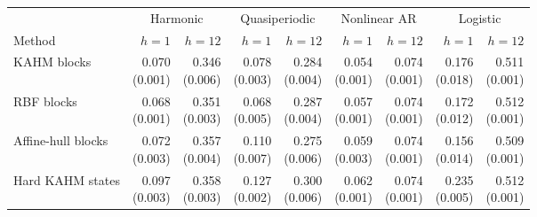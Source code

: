 \begin{table}[t]
\centering\small
\setlength{\tabcolsep}{3pt}
\begin{tabular}{lrrrrrrrr}
\toprule
& \multicolumn{2}{c}{Harmonic} & \multicolumn{2}{c}{Quasiperiodic} & \multicolumn{2}{c}{Nonlinear AR} & \multicolumn{2}{c}{Logistic}\\
Method & $h=1$ & $h=12$ & $h=1$ & $h=12$ & $h=1$ & $h=12$ & $h=1$ & $h=12$\\
\midrule
KAHM blocks & \shortstack[r]{0.070\\(0.001)} & \shortstack[r]{0.346\\(0.006)} & \shortstack[r]{0.078\\(0.003)} & \shortstack[r]{0.284\\(0.004)} & \shortstack[r]{0.054\\(0.001)} & \shortstack[r]{0.074\\(0.001)} & \shortstack[r]{0.176\\(0.018)} & \shortstack[r]{0.511\\(0.001)}\\[2pt]
RBF blocks & \shortstack[r]{0.068\\(0.001)} & \shortstack[r]{0.351\\(0.003)} & \shortstack[r]{0.068\\(0.005)} & \shortstack[r]{0.287\\(0.004)} & \shortstack[r]{0.057\\(0.001)} & \shortstack[r]{0.074\\(0.001)} & \shortstack[r]{0.172\\(0.012)} & \shortstack[r]{0.512\\(0.001)}\\[2pt]
Affine-hull blocks & \shortstack[r]{0.072\\(0.003)} & \shortstack[r]{0.357\\(0.004)} & \shortstack[r]{0.110\\(0.007)} & \shortstack[r]{0.275\\(0.006)} & \shortstack[r]{0.059\\(0.003)} & \shortstack[r]{0.074\\(0.001)} & \shortstack[r]{0.156\\(0.014)} & \shortstack[r]{0.509\\(0.001)}\\[2pt]
Hard KAHM states & \shortstack[r]{0.097\\(0.003)} & \shortstack[r]{0.358\\(0.003)} & \shortstack[r]{0.127\\(0.002)} & \shortstack[r]{0.300\\(0.006)} & \shortstack[r]{0.062\\(0.001)} & \shortstack[r]{0.074\\(0.001)} & \shortstack[r]{0.235\\(0.005)} & \shortstack[r]{0.512\\(0.001)}\\[2pt]

\end{tabular}
\end{table}
